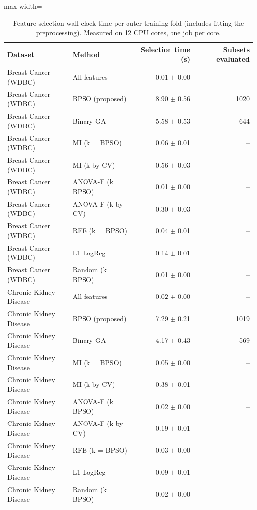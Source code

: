 \begin{table}[!t]
\centering
\caption{Feature-selection wall-clock time per outer training fold (includes fitting the preprocessing). Measured on 12 CPU cores, one job per core.}
\label{tab:runtime}
\footnotesize
\setlength{\tabcolsep}{4pt}
\begin{adjustbox}{max width=\linewidth}
\begin{tabular}{llrr}
\toprule
\textbf{Dataset} & \textbf{Method} & \textbf{Selection time (s)} & \textbf{Subsets evaluated} \\
\midrule
Breast Cancer (WDBC) & All features & 0.01 $\pm$ 0.00 & -- \\
Breast Cancer (WDBC) & BPSO (proposed) & 8.90 $\pm$ 0.56 & 1020 \\
Breast Cancer (WDBC) & Binary GA & 5.58 $\pm$ 0.53 & 644 \\
Breast Cancer (WDBC) & MI (k = BPSO) & 0.06 $\pm$ 0.01 & -- \\
Breast Cancer (WDBC) & MI (k by CV) & 0.56 $\pm$ 0.03 & -- \\
Breast Cancer (WDBC) & ANOVA-F (k = BPSO) & 0.01 $\pm$ 0.00 & -- \\
Breast Cancer (WDBC) & ANOVA-F (k by CV) & 0.30 $\pm$ 0.03 & -- \\
Breast Cancer (WDBC) & RFE (k = BPSO) & 0.04 $\pm$ 0.01 & -- \\
Breast Cancer (WDBC) & L1-LogReg & 0.14 $\pm$ 0.01 & -- \\
Breast Cancer (WDBC) & Random (k = BPSO) & 0.01 $\pm$ 0.00 & -- \\
Chronic Kidney Disease & All features & 0.02 $\pm$ 0.00 & -- \\
Chronic Kidney Disease & BPSO (proposed) & 7.29 $\pm$ 0.21 & 1019 \\
Chronic Kidney Disease & Binary GA & 4.17 $\pm$ 0.43 & 569 \\
Chronic Kidney Disease & MI (k = BPSO) & 0.05 $\pm$ 0.00 & -- \\
Chronic Kidney Disease & MI (k by CV) & 0.38 $\pm$ 0.01 & -- \\
Chronic Kidney Disease & ANOVA-F (k = BPSO) & 0.02 $\pm$ 0.00 & -- \\
Chronic Kidney Disease & ANOVA-F (k by CV) & 0.19 $\pm$ 0.01 & -- \\
Chronic Kidney Disease & RFE (k = BPSO) & 0.03 $\pm$ 0.00 & -- \\
Chronic Kidney Disease & L1-LogReg & 0.09 $\pm$ 0.01 & -- \\
Chronic Kidney Disease & Random (k = BPSO) & 0.02 $\pm$ 0.00 & -- \\

\end{tabular}
\end{adjustbox}
\end{table}
